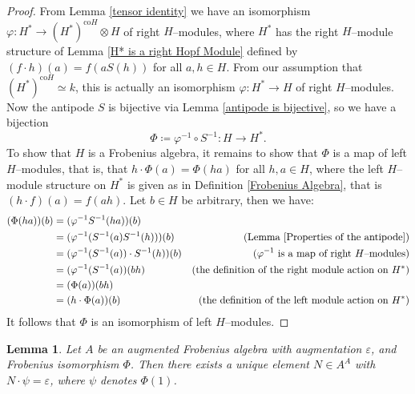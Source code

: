\documentclass{article}
\theoremstyle{plain}
\newtheorem{Lemma}[Th]{Lemma}
\theoremstyle{definition}
\begin{document}
\begin{proof}
    From Lemma \ref{tensor identity} we have an isomorphism $\varphi \colon H^* \to (H^*)^{\text{co}H} \otimes H$ of right $H$--modules, where $H^*$ has the right $H$--module structure of Lemma \ref{H* is a right Hopf Module} defined by $(f\cdot h)(a)=f(aS(h))$ for all $a, h\in H$. From our assumption that $(H^*)^{\text{co}H}\simeq k$, this is actually an isomorphism $\varphi \colon H^*\to H$ of right $H$--modules. Now the antipode $S$ is bijective via Lemma \ref{antipode is bijective}, so we have a bijection 
    \[
    \Phi\coloneqq \varphi^{-1}\circ S^{-1}\colon  H\to H^*.
    \]
     To show that $H$ is a Frobenius algebra, it remains to show that $\Phi$ is a map of left $H$--modules, that is, that $h\cdot \Phi(a)=\Phi(ha)$ for all $h, a\in H$, where the left $H$--module structure on $H^*$ is given as in Definition \ref{Frobenius Algebra}, that is $(h\cdot f)(a)=f(ah)$. Let $b\in H$ be arbitrary, then we have:\begin{align*}(\Phi(ha))(b)&=(\varphi^{-1}S^{-1}(ha))(b)\\
    &=(\varphi^{-1}(S^{-1}(a)S^{-1}(h)))(b) &\text{(Lemma \ref{Properties of the antipode})}\\
    &=(\varphi^{-1}(S^{-1}(a)) \cdot S^{-1}(h))(b) &(\varphi^{-1} \text{ is a map of right $H$--modules})\\
    &=(\varphi^{-1}(S^{-1}(a))(bh) &\text{(the definition of the right module action on $H^*$)}\\
     &=(\Phi(a))(bh) \\
     &=(h\cdot \Phi(a))(b)&\text{(the definition of the left module action on $H^*$)}
    \end{align*} 
    It follows that $\Phi$ is an isomorphism of left $H$--modules. 
\end{proof}


\begin{Lemma}\label{left norm}
    Let $A$ be an augmented Frobenius algebra with augmentation $\varepsilon$, and Frobenius isomorphism $\Phi$.  Then there exists a unique element $N\in A^A$ with $N\cdot \psi =\varepsilon$, where $\psi$ denotes $\Phi(1)$.
\end{Lemma}
\end{document}
